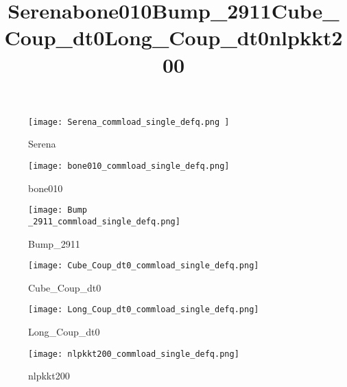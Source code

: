 \begin{figure}[H]
    \title{Serena}
    \begin{center}
        \texttt{[image: Serena\_commload\_single\_defq.png ]}
    \end{center}
    \caption{Serena}
    \label{fig:Serena_commload_single_defq.png}
\end{figure}

\begin{figure}[H]
    \title{bone010}
    \begin{center}
        \texttt{[image: bone010\_commload\_single\_defq.png]}
    \end{center}
    \caption{bone010}
    \label{fig:bone010_commload_single_defq.png}
\end{figure}

\begin{figure}[H]
    \title{Bump\_2911}
    \begin{center}
        \texttt{[image: Bump\\\_2911\_commload\_single\_defq.png]}
    \end{center}
    \caption{Bump\_2911}
    \label{fig:Bump_2911_defq_commload_single.png}
\end{figure}

\begin{figure}[H]
    \title{Cube\_Coup\_dt0}
    \begin{center}
        \texttt{[image: Cube\_Coup\_dt0\_commload\_single\_defq.png]}
    \end{center}
    \caption{Cube\_Coup\_dt0}
    \label{fig:Cube_Coup_dt0_commload_single_defq.png}
\end{figure}

\begin{figure}[H]
    \title{Long\_Coup\_dt0}
    \begin{center}
        \texttt{[image: Long\_Coup\_dt0\_commload\_single\_defq.png]}
    \end{center}
    \caption{Long\_Coup\_dt0}
    \label{fig:Long_Coup_dt0_commload_single_defq.png}
\end{figure}

\begin{figure}[H]
    \title{nlpkkt200}
    \begin{center}
        \texttt{[image: nlpkkt200\_commload\_single\_defq.png]}
    \end{center}
    \caption{nlpkkt200}
    \label{fig:nlpkkt200_defq_commload_single.png}
\end{figure}

